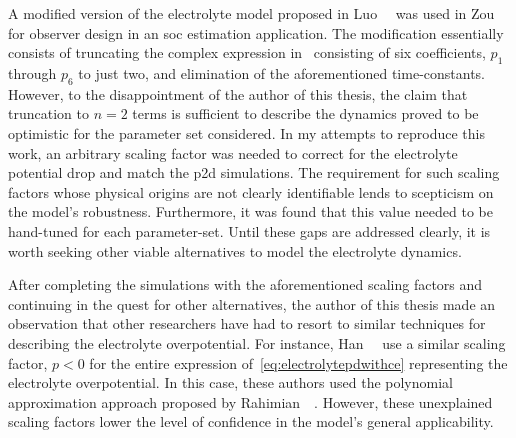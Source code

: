 A modified version of the electrolyte model proposed in Luo~\etal~\cite{Luo2013}
was  used  in Zou~\etal~\cite{Zou2016a}  for  observer  design in  an  \gls{soc}
estimation application. The modification  essentially consists of truncating the
complex  expression  in~\cite{Luo2013}  consisting of  six  coefficients,  $p_1$
through $p_6$ to just two, and elimination of the aforementioned time-constants.
However, to  the disappointment  of the  author of this  thesis, the  claim that
truncation to  $n=2$ terms is sufficient  to describe the dynamics  proved to be
optimistic for  the parameter set considered.  In my attempts to  reproduce this
work, an  arbitrary scaling  factor was  needed to  correct for  the electrolyte
potential drop  and match  the \gls{p2d} simulations.  The requirement  for such
scaling factors  whose physical  origins are not  clearly identifiable  lends to
scepticism on the model's robustness. Furthermore,  it was found that this value
needed to be  hand-tuned for each parameter-set. Until these  gaps are addressed
clearly, it is worth seeking other  viable alternatives to model the electrolyte
dynamics.

After  completing  the  simulations  with  the  aforementioned  scaling  factors
and  continuing  in  the  quest  for other  alternatives,  the  author  of  this
thesis  made  an observation  that  other  researchers  have  had to  resort  to
similar techniques  for describing the electrolyte  overpotential. For instance,
Han~\etal~\cite{Han2015a}  use   a  similar   scaling  factor,  $p<0$   for  the
entire expression of~\cref{eq:electrolytepdwithce}  representing the electrolyte
overpotential. In  this case,  these authors  used the  polynomial approximation
approach proposed by  Rahimian~\etal~\cite{KhaleghiRahimian2013}. However, these
unexplained scaling factors lower the level of confidence in the model's general
applicability.


